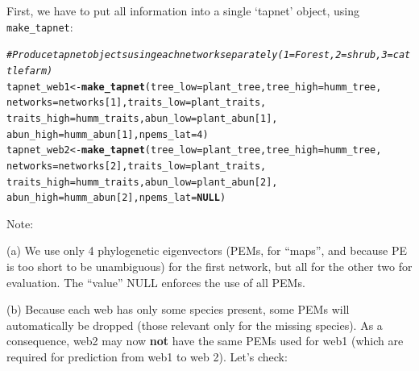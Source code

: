 \documentclass[a4paper, 11pt]{article}\usepackage[]{graphicx}\usepackage[]{color}
\makeatletter
\newcommand{\hlnum}[1]{\textcolor[rgb]{0.686,0.059,0.569}{#1}}%
\newcommand{\hlcom}[1]{\textcolor[rgb]{0.678,0.584,0.686}{\textit{#1}}}%
\newcommand{\hlstd}[1]{\textcolor[rgb]{0.345,0.345,0.345}{#1}}%
\newcommand{\hlkwa}[1]{\textcolor[rgb]{0.161,0.373,0.58}{\textbf{#1}}}%
\newcommand{\hlkwb}[1]{\textcolor[rgb]{0.69,0.353,0.396}{#1}}%
\newcommand{\hlkwc}[1]{\textcolor[rgb]{0.333,0.667,0.333}{#1}}%
\newcommand{\hlkwd}[1]{\textcolor[rgb]{0.737,0.353,0.396}{\textbf{#1}}}%
\newenvironment{kframe}{%
 \def\at@end@of@kframe{}%
 \ifinner\ifhmode%
  \def\at@end@of@kframe{\end{minipage}}%
  \begin{minipage}{\columnwidth}%
 \fi\fi%
 \def\FrameCommand##1{\hskip\@totalleftmargin \hskip-\fboxsep
 \colorbox{shadecolor}{##1}\hskip-\fboxsep
     \hskip-\linewidth \hskip-\@totalleftmargin \hskip\columnwidth}%
 \MakeFramed {\advance\hsize-\width
   \@totalleftmargin\z@ \linewidth\hsize
   \@setminipage}}%
 {\par\unskip\endMakeFramed%
 \at@end@of@kframe}
\newenvironment{knitrout}{}{} %
\newcommand{\code}[1]{\texttt{#1}}
\makeatother
\begin{document}
First, we have to put all information into a single `tapnet' object, using \code{make\_tapnet}:
\begin{knitrout}\small
{}\color{fgcolor}\begin{kframe}
\begin{alltt}
\hlcom{# Produce tapnet objects using each network separately (1=Forest, 2=shrub, 3=cattle farm)}
\hlstd{tapnet_web1} \hlkwb{<-} \hlkwd{make_tapnet}\hlstd{(}\hlkwc{tree_low} \hlstd{= plant_tree,} \hlkwc{tree_high} \hlstd{= humm_tree,}
                           \hlkwc{networks} \hlstd{= networks[}\hlnum{1}\hlstd{],} \hlkwc{traits_low} \hlstd{= plant_traits,}
                           \hlkwc{traits_high} \hlstd{= humm_traits,} \hlkwc{abun_low}\hlstd{=plant_abun[}\hlnum{1}\hlstd{],}
                           \hlkwc{abun_high}\hlstd{=humm_abun[}\hlnum{1}\hlstd{],} \hlkwc{npems_lat} \hlstd{=} \hlnum{4}\hlstd{)}
\hlstd{tapnet_web2} \hlkwb{<-} \hlkwd{make_tapnet}\hlstd{(}\hlkwc{tree_low} \hlstd{= plant_tree,} \hlkwc{tree_high} \hlstd{= humm_tree,}
                           \hlkwc{networks} \hlstd{= networks[}\hlnum{2}\hlstd{],} \hlkwc{traits_low} \hlstd{= plant_traits,}
                           \hlkwc{traits_high} \hlstd{= humm_traits,} \hlkwc{abun_low}\hlstd{=plant_abun[}\hlnum{2}\hlstd{],}
                           \hlkwc{abun_high}\hlstd{=humm_abun[}\hlnum{2}\hlstd{],} \hlkwc{npems_lat} \hlstd{=} \hlkwa{NULL}\hlstd{)}
\end{alltt}
\end{kframe}
\end{knitrout}
Note: 

(a) We use only 4 phylogenetic eigenvectors (PEMs, for ``maps'', and because PE is too short to be unambiguous) for the first network, but all for the other two for evaluation. The ``value'' NULL enforces the use of all PEMs.

(b) Because each web has only some species present, some PEMs will automatically be dropped (those relevant only for the missing species). As a consequence, web2 may now \textbf{not} have the same PEMs used for web1 (which are required for prediction from web1 to web 2). Let's check:
\end{document}
